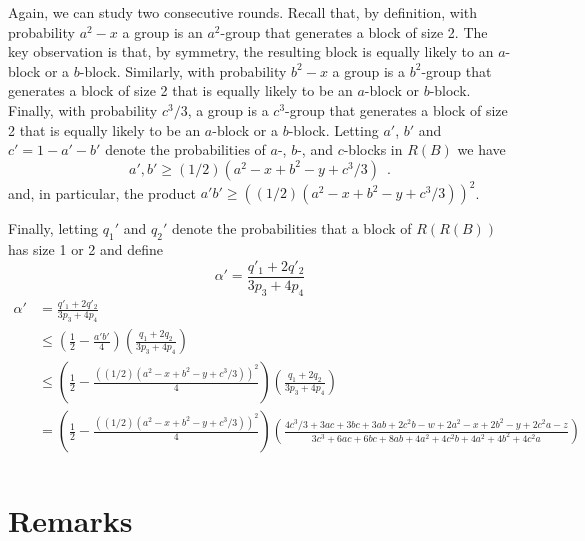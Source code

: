 \documentclass{patmorin}
\begin{document}
Again, we can study two consecutive rounds.  Recall that, by definition,
with probability $a^2-x$ a group is an $a^2$-group that generates a
block of size 2.  The key observation is that, by symmetry, the resulting
block is equally likely to an $a$-block or a $b$-block.
Similarly, with probability $b^2-x$ a group is a $b^2$-group that generates a block of size 2 that is equally likely to be an $a$-block or $b$-block.
Finally, with probability $c^3/3$, a group is a $c^3$-group that generates a block of size 2 that is equally likely to be an $a$-block or a $b$-block.
Letting $a'$, $b'$ and $c'=1-a'-b'$ denote the probabilities of $a$-, $b$-, and $c$-blocks in $R(B)$ we have
\[
   a',b' \ge (1/2)(a^2-x+b^2-y+c^3/3)  \enspace .
\]  
and, in particular, the product $a'b' \ge ((1/2)(a^2-x+b^2-y+c^3/3))^2$.

Finally, letting $q_1'$ and $q_2'$ denote the probabilities that a block
of $R(R(B))$ has size 1 or 2 and define 
\[
    \alpha' = \frac{q'_1+2q'_2}{3p_3 + 4p_4}
\]
\begin{align*}
    \alpha' & = \frac{q'_1+2q'_2}{3p_3 + 4p_4} \\
            & \le \left(\frac{1}{2}-\frac{a'b'}{4}\right)
               \left(\frac{q_1+2q_2}{3p_3+4p_4} \right) \\
            & \le \left(\frac{1}{2}-\frac{((1/2)(a^2-x+b^2-y+c^3/3))^2}{4}\right)
               \left(\frac{q_1+2q_2}{3p_3+4p_4} \right) \\
        & =\left(\frac{1}{2}-\frac{((1/2)(a^2-x+b^2-y+c^3/3))^2}{4}\right)
        \left(\frac
        {4c^3/3 + 3ac + 3bc + 3ab + 2c^2b -w + 2a^2 - x + 2b^2 - y + 2c^2a -z}
        {3c^3 + 6ac + 6bc + 8ab + 4a^2 + 4c^2b + 4a^2 + 4b^2 + 4c^2a}\right) \\
%
%
\end{align*}


\section{Remarks}



\end{document}

